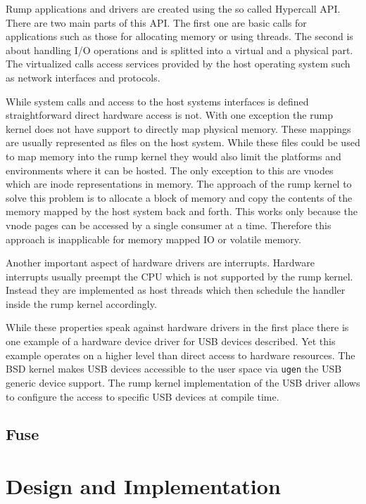 \documentclass[
a4paper,
12pt,
notitlepage,
parskip=half,
DIV=11,
]{scrbook}
\begin{document}
		Rump applications and drivers are created using the so called Hypercall API.
		There are two main parts of this API.
		The first one are basic calls for applications such as those for allocating memory or using threads.
		The second is about handling I/O operations and is splitted into a virtual and a physical part.
		The virtualized calls access services provided by the host operating system such as network interfaces and protocols. \citep{rump_man} \citep{rump_platform}
		
		While system calls and access to the host systems interfaces is defined straightforward direct hardware access is not.
		With one exception the rump kernel does not have support to directly map physical memory.
		These mappings are usually represented as files on the host system.
		While these files could be used to map memory into the rump kernel they would also limit the platforms and environments where it can be hosted.
		The only exception to this are vnodes which are inode representations in memory.
		The approach of the rump kernel to solve this problem is to allocate a block of memory and copy the contents of the memory mapped by the host system back and forth.
		This works only because the vnode pages can be accessed by a single consumer at a time.
		Therefore this approach is inapplicable for memory mapped IO or volatile memory. \citep{kantee}
		
		Another important aspect of hardware drivers are interrupts.
		Hardware interrupts usually preempt the CPU which is not supported by the rump kernel.
		Instead they are implemented as host threads which then schedule the handler inside the rump kernel accordingly. \citep{kantee}
		
		While these properties speak against hardware drivers in the first place there is one example of a hardware device driver for USB devices described.
		Yet this example operates on a higher level than direct access to hardware resources.
		The BSD kernel makes USB devices accessible to the user space via \texttt{ugen} the USB generic device support.
		The rump kernel implementation of the USB driver allows to configure the access to specific USB devices at compile time. \citep{kantee} \citep{ugen}
		
		\section{Fuse}
	
	
	\chapter{Design and Implementation}
	
\end{document}
